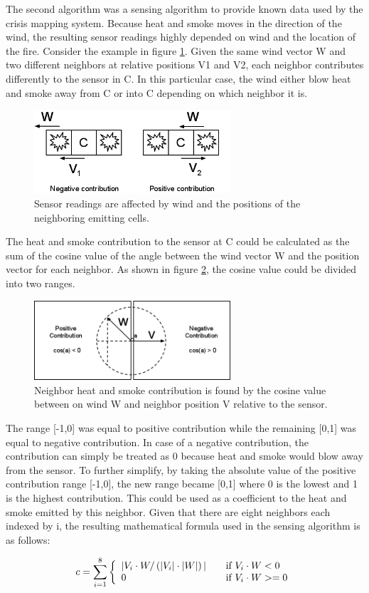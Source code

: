 The second algorithm was a sensing algorithm to provide known data used by the crisis mapping system. Because heat and smoke moves in the direction of the wind, the resulting sensor readings highly depended on wind and the location of the fire. Consider the example in figure \ref{fig:sense-concept}. Given the same wind vector W and two different neighbors at relative positions V1 and V2, each neighbor contributes differently to the sensor in C. In this particular case, the wind either blow heat and smoke away from C or into C depending on which neighbor it is.

\begin{figure}[here]
\centering
\includegraphics[width=0.65\textwidth]{solution/graphics/sense-concept.png}
\caption{Sensor readings are affected by wind and the positions of the neighboring emitting cells.}
\label{fig:sense-concept}
\end{figure}

The heat and smoke contribution to the sensor at C could be calculated as the sum of the cosine value of the angle between the wind vector W and the position vector for each neighbor. As shown in figure \ref{fig:sensor-contribution}, the cosine value could be divided into two ranges.

\begin{figure}[here]
\centering
\includegraphics[width=0.65\textwidth]{solution/graphics/sensor-contribution.png}
\caption{Neighbor heat and smoke contribution is found by the cosine value between on wind W and neighbor position V relative to the sensor.}
\label{fig:sensor-contribution}
\end{figure}

The range [-1,0] was equal to positive contribution while the remaining [0,1] was equal to negative contribution. In case of a negative contribution, the contribution can simply be treated as 0 because heat and smoke would blow away from the sensor. To further simplify, by taking the absolute value of the positive contribution range [-1,0], the new range became [0,1] where 0 is the lowest and 1 is the highest contribution. This could be used as a coefficient to the heat and smoke emitted by this neighbor. Given that there are eight neighbors each indexed by i, the resulting mathematical formula used in the sensing algorithm is as follows:

\[
  c = \sum_{\substack i=1}^8\left\{
  \begin{array}{l l}
    |V_i \cdot W / \left(|V_i | \cdot |W| \right)| & \quad \text{if $V_i \cdot W < 0$}\\
   0 & \quad \text{if $V_i \cdot W >= 0$}\\
  \end{array} \right.
\]
